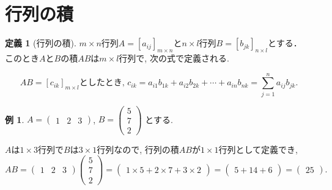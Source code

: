 \documentclass[dvipdfmx,a4paper,11pt]{article}
\theoremstyle{definition}
\newtheorem{dfn}[thm]{定義}
\newtheorem{exa}[thm]{例}
\begin{document}
 \section{行列の積}
 
  \begin{tcolorbox}[
    colback = white,
    colframe = green!35!black,
    fonttitle = \bfseries,
    breakable = true]
    \begin{dfn}[行列の積]
    
 $m \times n$行列$A = [a_{ij}]_{m \times n}$と$n \times l$行列$B= [b_{jk}]_{n \times l}$とする．
このとき$A$と$B$の積$AB$は$m \times l$行列で, 次の式で定義される.

$$
AB = [c_{ik}]_{m \times l}\text{としたとき, }
c_{ik} = a_{i1}b_{1k} + a_{i2}b_{2k} + \cdots + a_{in}b_{nk} = \sum_{j=1}^{n} a_{ij}b_{jk}.
$$
  \end{dfn}
 \end{tcolorbox}
 
 \begin{exa}
 $ A=\begin{pmatrix} 1 &2 &3 \end{pmatrix}$, 
 $ 
 B = 
 \begin{pmatrix}
5 \\7\\2
 \end{pmatrix}
 $
 とする. 
 
 $A$は$1\times 3$行列で$B$は$3 \times 1$行列なので, 行列の積$AB$が$1 \times 1$行列として定義でき, 
 $$
 AB = \begin{pmatrix}1 &2&3  \end{pmatrix}
 \begin{pmatrix}
5 \\7\\2
 \end{pmatrix}
 = \begin{pmatrix}1\times 5 + 2 \times 7 + 3 \times 2  \end{pmatrix}= 
  \begin{pmatrix}5+14+6 \end{pmatrix}= \begin{pmatrix}25 \end{pmatrix}.
 $$
 
 \end{exa}
 
\end{document}

